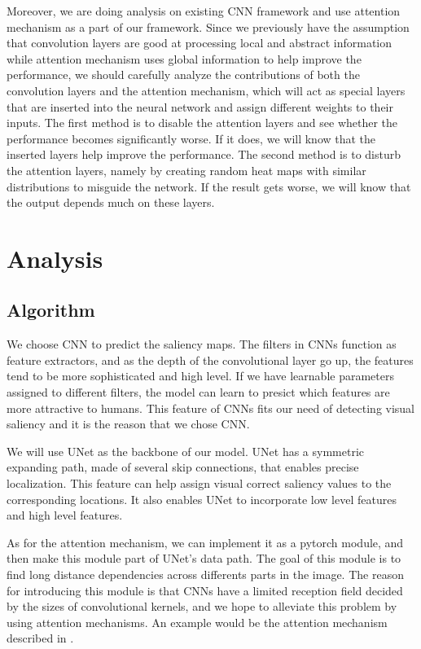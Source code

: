\documentclass[12pt]{article}
\begin{document}
Moreover, we are doing analysis on existing CNN framework and use attention mechanism as a part of our framework. Since we previously have the assumption that convolution layers are good at processing local and abstract information while attention mechanism uses global information to help improve the performance, we should carefully analyze the contributions of both the convolution layers and the attention mechanism, which will act as special layers that are inserted into the neural network and assign different weights to their inputs.
The first method is to disable the attention layers and see whether the performance becomes significantly worse. If it does, we will know that the inserted layers help improve the performance.
The second method is to disturb the attention layers, namely by creating random heat maps with similar distributions to misguide the network. If the result gets worse, we will know that the output depends much on these layers.

\section{Analysis}
\subsection{Algorithm}
We choose CNN to predict the saliency maps. The filters in CNNs function as feature extractors,
and as the depth of the convolutional layer go up, the features tend to be more sophisticated
and high level. If we have learnable parameters assigned to different filters, the model can
learn to presict which features are more attractive to humans. 
This feature of CNNs fits our need of detecting visual saliency and it is the reason that we 
chose CNN.

We will use UNet \cite{ronnebergerUNetConvolutionalNetworks2015} as the backbone of our model. UNet has a symmetric expanding path, made of
several skip connections, that enables precise localization. This feature can help assign visual correct saliency values 
to the corresponding locations. It also enables UNet to incorporate low level features and
high level features.

As for the attention mechanism, we can implement it as a pytorch module, and then make this module
part of UNet's data path. The goal of this module is to find long distance dependencies across 
differents parts in the image. The reason for introducing this module is that CNNs have a limited
reception field decided by the sizes of convolutional kernels, and we hope to alleviate this problem
by using attention mechanisms. An example would be the attention mechanism described in \cite{zhangSelfAttentionGenerativeAdversarial2019a}.
\end{document}
